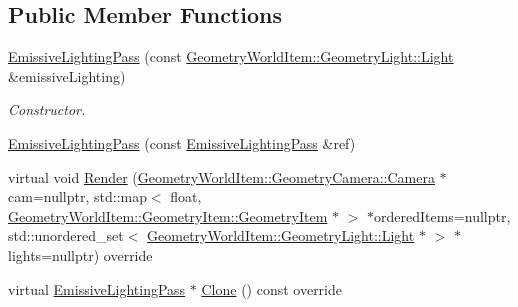 \subsection*{Public Member Functions}
\begin{DoxyCompactItemize}
\item 
\mbox{\label{class_geometry_engine_1_1_geometry_render_step_1_1_emissive_lighting_pass_a826e0eee0473e47302406b328bc73104}} 
\mbox{\hyperlink{class_geometry_engine_1_1_geometry_render_step_1_1_emissive_lighting_pass_a826e0eee0473e47302406b328bc73104}{Emissive\+Lighting\+Pass}} (const \mbox{\hyperlink{class_geometry_engine_1_1_geometry_world_item_1_1_geometry_light_1_1_light}{Geometry\+World\+Item\+::\+Geometry\+Light\+::\+Light}} \&emissive\+Lighting)
\begin{DoxyCompactList}\small\item\em Constructor. \end{DoxyCompactList}\item 
\mbox{\hyperlink{class_geometry_engine_1_1_geometry_render_step_1_1_emissive_lighting_pass_af05c874fca05ebac313f13bbccbbb4d3}{Emissive\+Lighting\+Pass}} (const \mbox{\hyperlink{class_geometry_engine_1_1_geometry_render_step_1_1_emissive_lighting_pass}{Emissive\+Lighting\+Pass}} \&ref)
\item 
virtual void \mbox{\hyperlink{class_geometry_engine_1_1_geometry_render_step_1_1_emissive_lighting_pass_a03eb4da70618421703fc71d61669321d}{Render}} (\mbox{\hyperlink{class_geometry_engine_1_1_geometry_world_item_1_1_geometry_camera_1_1_camera}{Geometry\+World\+Item\+::\+Geometry\+Camera\+::\+Camera}} $\ast$cam=nullptr, std\+::map$<$ float, \mbox{\hyperlink{class_geometry_engine_1_1_geometry_world_item_1_1_geometry_item_1_1_geometry_item}{Geometry\+World\+Item\+::\+Geometry\+Item\+::\+Geometry\+Item}} $\ast$ $>$ $\ast$ordered\+Items=nullptr, std\+::unordered\+\_\+set$<$ \mbox{\hyperlink{class_geometry_engine_1_1_geometry_world_item_1_1_geometry_light_1_1_light}{Geometry\+World\+Item\+::\+Geometry\+Light\+::\+Light}} $\ast$ $>$ $\ast$lights=nullptr) override
\item 
virtual \mbox{\hyperlink{class_geometry_engine_1_1_geometry_render_step_1_1_emissive_lighting_pass}{Emissive\+Lighting\+Pass}} $\ast$ \mbox{\hyperlink{class_geometry_engine_1_1_geometry_render_step_1_1_emissive_lighting_pass_a5a46d5e73fe672e09584a2e6e8bfa5e8}{Clone}} () const override
\end{DoxyCompactItemize}
